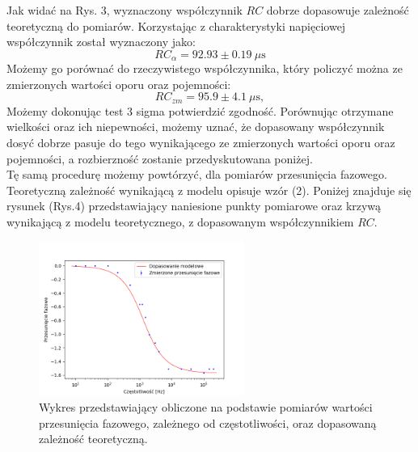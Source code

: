 \documentclass[10pt,a4paper]{article}
\begin{document}
Jak widać na Rys. 3, wyznaczony współczynnik $RC$ dobrze dopasowuje zależność teoretyczną do pomiarów. Korzystając z charakterystyki napięciowej współczynnik został wyznaczony jako:
$$ RC_{\alpha} = 92.93 \pm 0.19 \ \mu \text{s} $$
Możemy go porównać do rzeczywistego współczynnika, który policzyć można ze zmierzonych wartości oporu oraz pojemności:
$$ RC_{zm} = 95.9 \pm 4.1 \ \mu \text{s}, $$
Możemy dokonując test 3 sigma potwierdzić zgodność.
Porównując otrzymane wielkości oraz ich niepewności, możemy uznać, że dopasowany współczynnik dosyć dobrze pasuje do tego wynikającego ze zmierzonych wartości oporu oraz pojemności, a rozbierzność zostanie przedyskutowana poniżej. \\
Tę samą procedurę możemy powtórzyć, dla pomiarów przesunięcia fazowego. Teoretyczną zależność wynikającą z modelu opisuje wzór (2). Poniżej znajduje się rysunek (Rys.4) przedstawiający naniesione punkty pomiarowe oraz krzywą wynikającą z modelu teoretycznego, z dopasowanym współczynnikiem $RC$.

\begin{figure}[ht!]	
	\begin{center}
		\includegraphics[width = 0.6\textwidth]{phi.png}
		\caption{Wykres przedstawiający obliczone na podstawie pomiarów wartości przesunięcia fazowego, zależnego od częstotliwości, oraz dopasowaną zależność teoretyczną.}
	\end{center}
\end{figure}	
\end{document}

